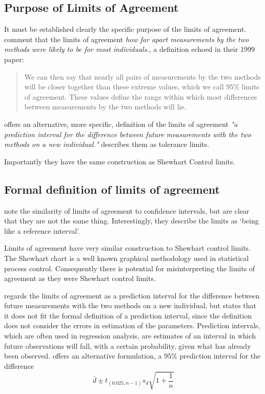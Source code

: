 \documentclass[Main.tex]{subfiles}
\begin{document}
	


	
	\subsection{Purpose of Limits of Agreement} It must be established
	clearly the specific purpose of the limits of agreement.
	\citet*{BA95} comment that the limits of agreement \emph{how far
		apart measurements by the two methods were likely to be for most
		individuals.}, a definition echoed in their 1999 paper:
	\begin{quote} We can then say that nearly all pairs
		of measurements by the two methods will be closer together than
		these extreme values, which we call 95\% limits of agreement.
		These values define the range within which most differences
		between measurements by the two methods will lie\citep{BA99}.
	\end{quote}
	\citet{BXC} offers an alternative, more specific,  definition of
	the limits of agreement \emph{"a prediction interval for the
		difference between future measurements with the two methods on a
		new individual."} \citet{luiz} describes them as tolerance limits.
	
	Importantly they have the same construction as Shewhart Control
	limits.

\subsection{Formal definition of limits of agreement}
\citet{BA99} note the similarity of limits of agreement to
confidence intervals, but are clear that they are not the same
thing. Interestingly, they describe the limits as `being like a
reference interval'.

Limits of agreement have very similar construction to Shewhart
control limits. The Shewhart chart is a well known graphical
methodology used in statistical process control. Consequently
there is potential for misinterpreting the limits of agreement as
they were Shewhart control limits. 

\citet{BXC2008} regards the limits of agreement as a prediction
interval for the difference between future measurements with the
two methods on a new individual, but states that it does not fit
the formal definition of a prediction interval, since the
definition does not consider the errors in estimation of the
parameters. Prediction intervals, which are often used in
regression analysis, are estimates of an interval in which future
observations will fall, with a certain probability, given what has
already been observed. \citet{BXC2008} offers an alternative
formulation, a $95\%$ prediction interval for the difference
\[
\bar{d} \pm t_{(0.025, n-1)}s_{d} \sqrt{1+\frac{1}{n}}
\]
\end{document}
